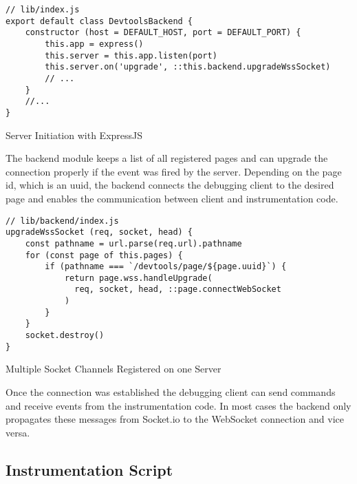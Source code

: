 \begin{listing}[H]
\begin{verbatim}
// lib/index.js
export default class DevtoolsBackend {
    constructor (host = DEFAULT_HOST, port = DEFAULT_PORT) {
        this.app = express()
        this.server = this.app.listen(port)
        this.server.on('upgrade', ::this.backend.upgradeWssSocket)
        // ...
    }
    //...
}
\end{verbatim}
\caption{Server Initiation with ExpressJS}
\label{lst:socketUpgrade}
\end{listing}

The backend module keeps a list of all registered pages and can upgrade the connection properly if the event was fired by the server. Depending on the page id, which is an uuid, the backend connects the debugging client to the desired page and enables the communication between client and instrumentation code.

\begin{listing}[H]
\begin{verbatim}
// lib/backend/index.js
upgradeWssSocket (req, socket, head) {
    const pathname = url.parse(req.url).pathname
    for (const page of this.pages) {
        if (pathname === `/devtools/page/${page.uuid}`) {
            return page.wss.handleUpgrade(
              req, socket, head, ::page.connectWebSocket
            )
        }
    }
    socket.destroy()
}
\end{verbatim}
\caption{Multiple Socket Channels Registered on one Server}
\label{lst:socket}
\end{listing}

Once the connection was established the debugging client can send commands and receive events from the instrumentation code. In most cases the backend only propagates these messages from Socket.io to the WebSocket connection and vice versa.

\subsection{Instrumentation Script}


